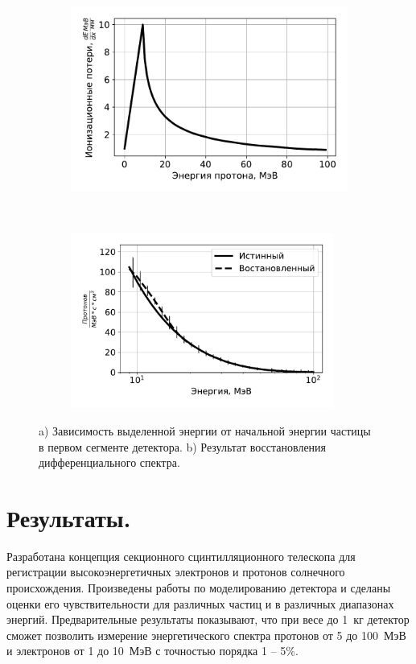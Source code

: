 \documentclass[12pt, a4paper, notitlepage, onecolumn]{article}
\begin{document}
\begin{figure}[ht!]
	\begin{subfigure}[b]{0.5\textwidth}
    	\includegraphics[width=0.95\linewidth]{pictures/05_LossInCell.pdf}
        \caption{}
        \label{pic-03-a}
    \end{subfigure}
	~
    \begin{subfigure}[b]{0.5\textwidth}
		\includegraphics[width=0.95\textwidth]{pictures/06_IntegralSpectrum.pdf}

        \caption{}
        \label{pic-03-b}
    \end{subfigure}
    \caption{ a) Зависимость выделенной энергии от начальной энергии частицы в первом сегменте детектора. b) Результат восстановления дифференциального спектра.}
\end{figure}



\section*{Результаты.}
Разработана концепция секционного сцинтилляционного телескопа для регистрации высокоэнергетичных электронов и протонов солнечного происхождения. Произведены работы по моделированию детектора и сделаны оценки его чувствительности для различных частиц и в различных диапазонах энергий. Предварительные результаты показывают, что при весе до 1~кг детектор сможет позволить измерение энергетического спектра протонов от 5 до 100~МэВ и электронов от 1 до 10~МэВ с точностью порядка 1 -- 5\%.
\end{document}
